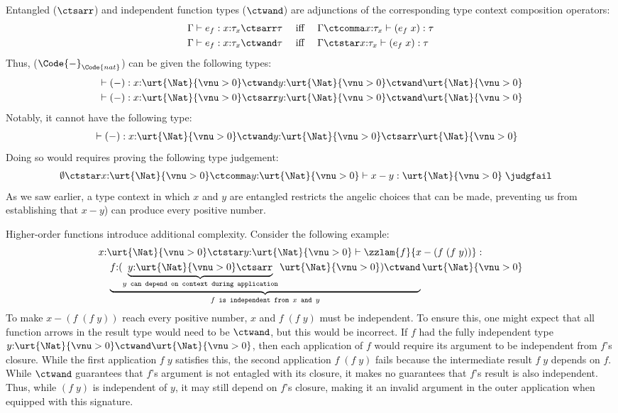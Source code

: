 Entangled ($\ctsarr$) and independent
function types ($\ctwand$) are adjunctions of the corresponding type
context composition operators:
\begin{align*}
  \Gamma \vdash e_f : x{:}\tau_x \ctsarr \tau \quad &\text{ iff } \quad \Gamma \ctcomma x{:}\tau_x \vdash (e_f\;x) : \tau
  \\\Gamma \vdash e_f : x{:}\tau_x \ctwand \tau \quad &\text{ iff } \quad \Gamma \ctstar x{:}\tau_x \vdash (e_f\;x) : \tau
\end{align*}\noindent
Thus, ($\Code{-}_{\Code{nat}}$) can be given the following types:
\begin{align*}
  &\vdash (-) : x{:}\urt{\Nat}{\vnu > 0} \ctwand y{:}\urt{\Nat}{\vnu > 0} \ctwand \urt{\Nat}{\vnu > 0}
  \\&\vdash (-) : x{:}\urt{\Nat}{\vnu > 0} \ctsarr y{:}\urt{\Nat}{\vnu > 0} \ctwand \urt{\Nat}{\vnu > 0}
\end{align*}\noindent
Notably, it cannot have the following type:
\begin{align*}
  &\vdash (-) : x{:}\urt{\Nat}{\vnu > 0} \ctwand y{:}\urt{\Nat}{\vnu > 0} \ctsarr \urt{\Nat}{\vnu > 0}
\end{align*}\noindent
Doing so would requires proving the following type judgement:
\begin{align*}
  &\emptyset \ctstar x{:}\urt{\Nat}{\vnu > 0} \ctcomma y{:}\urt{\Nat}{\vnu > 0} \vdash x - y : \urt{\Nat}{\vnu > 0} \;\judgfail
\end{align*}\noindent
As we saw earlier, a type context in which $x$ and $y$ are entangled
restricts the angelic choices that can be made, preventing us from
establishing that $x - y$) can produce every positive number.

Higher-order functions introduce additional complexity. Consider the
following example:
\begin{align*}
  &x{:}\urt{\Nat}{\vnu > 0} \ctstar y{:}\urt{\Nat}{\vnu > 0} \vdash \zzlam{f}{x - (f\; (f\;y))} :
  \\&\quad  \underbrace{f{:}(\underbrace{y{:}\urt{\Nat}{\vnu > 0} \ctsarr}_\texttt{$y$ can depend on context during application} \urt{\Nat}{\vnu > 0}) \ctwand}_\texttt{$f$ is independent from $x$ and $y$} \urt{\Nat}{\vnu > 0}
\end{align*}\noindent
To make $x - (f\;(f\;y))$ reach every positive number, $x$ and
$f\;(f\;y)$ must be independent.  To ensure this, one might expect
that all function arrows in the result type would need to be
$\ctwand$, but this would be incorrect. If $f$ had the fully
independent type
$y{:}\urt{\Nat}{\vnu > 0} \ctwand \urt{\Nat}{\vnu > 0}$, then each
application of $f$ would require its argument to be independent from
$f$'s closure. While the first application $f\;y$ satisfies this, the
second application $f\;(f\;y)$ fails because the intermediate result
$f\;y$ depends on $f$.  While $\ctwand$ guarantees that $f$'s argument
is not entagled with its closure, it makes no guarantees that $f$'s
result is also independent.  Thus, while $(f\; y)$ is independent of
$y$, it may still depend on $f$'s closure, making it an invalid
argument in the outer application when equipped with this signature.

